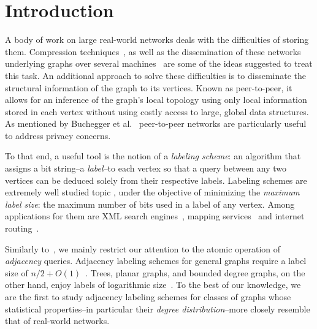 

\section{Introduction}
A body of work on large real-world networks  deals with the difficulties of storing them.
Compression techniques~\cite{boldi2004webgraph,boldi2011layered}, as  well as the dissemination  of these networks underlying graphs over several machines~\cite{gonzalez2012powergraph, stanton2012streaming} are some of the ideas suggested to treat this task.
An additional  approach to solve these difficulties is to disseminate the structural information of the graph to its vertices. Known as peer-to-peer, it  allows for an inference of the graph's local topology  using only local information stored in each vertex without using costly access to large, global data structures. 
As mentioned by   Buchegger et al.~\cite{buchegger2009peerson}  peer-to-peer  networks are particularly useful to address privacy concerns.

To that end, a useful tool is the notion of a \emph{ labeling scheme}: an algorithm that assigns a bit string--a \emph{label}--to each vertex so that a query between any two vertices can be deduced solely from their respective labels. 
Labeling schemes are extremely well studied topic \cite{}, under the objective of  minimizing the \emph{maximum label size}: the maximum number of bits used in a label of any vertex. Among applications for them are   XML search engines~\cite{cohen2010labeling}, mapping services~\cite{abraham2011hub} and internet routing~\cite{krioukov2004compact}.

Similarly to~\cite{}, we mainly restrict our attention to the atomic operation of \emph{adjacency} queries. 
Adjacency labeling schemes for general graphs  require a label size of $n/2+O(1)$~\cite{moon1965minimal, alstrup2014adjacency}.
Trees, planar graphs, and bounded degree graphs, on the other hand,   enjoy labels of logarithmic size~\cite{Alstrup02, gavoille2007shorter, adjiashvili2014labeling}. To the best of our knowledge, we are the first to study adjacency labeling schemes for classes of graphs whose statistical properties--in particular their \emph{degree distribution}--more closely resemble that of real-world networks.

